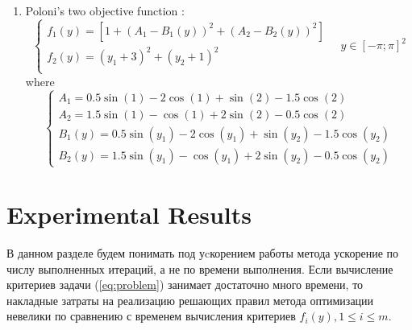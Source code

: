 \documentclass{llncs}
\begin{document}
\begin{enumerate}
\begin{equation}
      \right .
      \quad y\in [-5;10]
    \end{equation}
  \item Poloni's two objective function \cite{valedhuizenSuite}:
    \begin{equation}
      \left \{
      \begin{array}{l}
        f_{1}\left(y\right) = \left[1 + \left(A_{1} - B_{1}\left(y\right) \right)^{2} + \left(A_{2} - B_{2}\left(y\right) \right)^{2} \right] \\
        f_{2}\left(y\right) = \left(y_1 + 3\right)^{2} + \left(y_2 + 1 \right)^{2} \\
      \end{array}
      \right .
      \quad y\in [-\pi;\pi]^2
    \end{equation}
    where
    \begin{equation*}
      \begin{cases}
        A_{1} = 0.5 \sin \left(1\right) - 2 \cos \left(1\right) + \sin \left(2\right) - 1.5 \cos \left(2\right)  \\
        A_{2} = 1.5 \sin \left(1\right) - \cos \left(1\right) + 2 \sin \left(2\right) - 0.5 \cos \left(2\right)  \\
        B_{1}\left(y\right) = 0.5 \sin \left(y_1\right) - 2 \cos \left(y_1\right) + \sin \left(y_2\right) - 1.5 \cos \left(y_2\right)  \\
        B_{2}\left(y\right) = 1.5 \sin \left(y_1\right) - \cos \left(y_1\right) + 2 \sin \left(y_2\right) - 0.5 \cos \left(y_2\right)
      \end{cases}
    \end{equation*}
\end{enumerate}
\section{Experimental Results}
В данном разделе будем понимать под уcкорением работы метода ускорение по числу выполненных итераций, а не по времени выполнения. Если вычисление критериев задачи (\ref{eq:problem}) занимает достаточно много времени, то накладные затраты на реализацию решающих правил метода оптимизации невелики по сравнению с временем вычисления критериев \(f_i(y), 1\leqslant i\leqslant m\).
\end{document}

